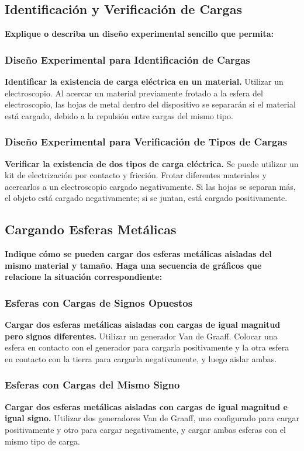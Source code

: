 \subsection{Identificación y Verificación de Cargas}
\textbf{Explique o describa un diseño experimental sencillo que permita:}
\subsubsection{Diseño Experimental para Identificación de Cargas}
\textbf{Identificar la existencia de carga eléctrica en un material.} Utilizar un electroscopio. Al acercar un material previamente frotado a la esfera del electroscopio, las hojas de metal dentro del dispositivo se separarán si el material está cargado, debido a la repulsión entre cargas del mismo tipo.

\subsubsection{Diseño Experimental para Verificación de Tipos de Cargas}
\textbf{Verificar la existencia de dos tipos de carga eléctrica.} Se puede utilizar un kit de electrización por contacto y fricción. Frotar diferentes materiales y acercarlos a un electroscopio cargado negativamente. Si las hojas se separan más, el objeto está cargado negativamente; si se juntan, está cargado positivamente.

\subsection{Cargando Esferas Metálicas}
\textbf{Indique cómo se pueden cargar dos esferas metálicas aisladas del mismo material y
tamaño. Haga una secuencia de gráficos que relacione la situación correspondiente:}
\subsubsection{Esferas con Cargas de Signos Opuestos}
\textbf{Cargar dos esferas metálicas aisladas con cargas de igual magnitud pero signos diferentes.} Utilizar un generador Van de Graaff. Colocar una esfera en contacto con el generador para cargarla positivamente y la otra esfera en contacto con la tierra para cargarla negativamente, y luego aislar ambas.

\subsubsection{Esferas con Cargas del Mismo Signo}
\textbf{Cargar dos esferas metálicas aisladas con cargas de igual magnitud e igual signo.} Utilizar dos generadores Van de Graaff, uno configurado para cargar positivamente y otro para cargar negativamente, y cargar ambas esferas con el mismo tipo de carga.

